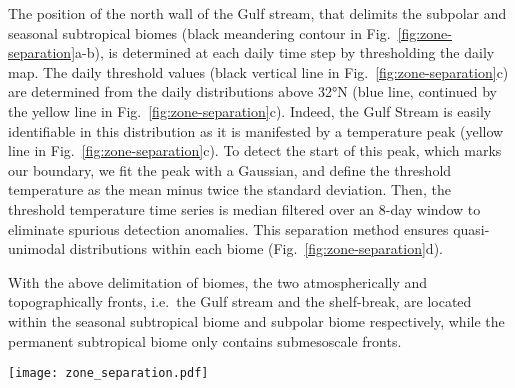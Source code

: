 The position of the north wall of the Gulf stream, that delimits the subpolar and seasonal subtropical biomes (black meandering contour in Fig.~\ref{fig:zone-separation}a-b), is determined at each daily time step by thresholding the daily  map.
The daily threshold values (black vertical line in Fig.~\ref{fig:zone-separation}c) are determined from the daily  distributions above 32°N (blue line, continued by the yellow line in Fig.~\ref{fig:zone-separation}c).
Indeed, the Gulf Stream is easily identifiable in this distribution as it is manifested by a temperature peak (yellow line in Fig.~\ref{fig:zone-separation}c).
To detect the start of this peak, which marks our boundary, we fit the peak with a Gaussian, and define the threshold temperature as the mean minus twice the standard deviation.
Then, the threshold temperature time series is median filtered over an 8-day window to eliminate spurious detection anomalies.
This separation method ensures quasi-unimodal  distributions within each biome (Fig.~\ref{fig:zone-separation}d).

With the above delimitation of biomes, the two atmospherically and topographically fronts, i.e.\ the Gulf stream and the shelf-break, are located within the seasonal subtropical biome and subpolar biome respectively, while the permanent subtropical biome only contains submesoscale fronts.

\begin{figure*}
  \texttt{[image: zone\_separation.pdf]}
  \caption{
    Delimitation of the three biomes in the Gulf stream extension region: the Permanent Subtropical Biome~(PSB, south of the dashed line at~\ang{32}N), the Seasonal Subtropical Biome~(SSB, between~\ang{32}N and the meandering Gulf stream northern wall on that day marked with the black contour), and the Subpolar Biome~(PB, north of the Gulf stream northern wall).
    (a)~ and (b)~ snapshots on the 22 April 2007 (with data masked by clouds in white), (c)~ and (d)~  distribution within each biome for the same day (PB:\@blue, SSB:\@yellow, PSB:\@red).
    The black line in~(c) shows the  threshold value detected to delimit the Gulf Stream northern wall (see methods section).
    The x"-axis of the distributions correspond to the x-axis scale of the corresponding color bars.
    The red line follows the 1500m isobath.
    Data on the continental shelf~(\qty{<1500}{\m}) is not considered here and have been masked.
  }%
  \label{fig:zone-separation}
\end{figure*}

